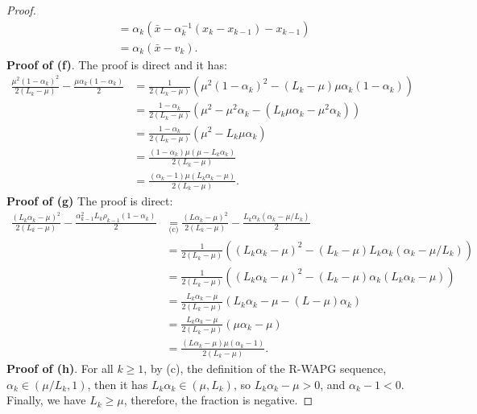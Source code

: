 \documentclass[12pt]{article}
\begin{document}
\begin{proof}
\begin{align*}
                &= \alpha_k(\bar x - \alpha_k^{-1}(x_k - x_{k - 1}) - x_{k - 1})
                \\
                &= \alpha_k (\bar x - v_k).
            \end{align*}
            \textbf{Proof of (f)}. 
            The proof is direct and it has: 
            \begin{align*}
                \frac{\mu^2(1 - \alpha_k)^2}{2(L_k - \mu)} - \frac{\mu\alpha_k(1 - \alpha_k)}{2}
                &= 
                \frac{1}{2(L_k - \mu)}\left(
                    \mu^2(1 - \alpha_k)^2 - (L_k - \mu)\mu \alpha_k(1 - \alpha_k)
                \right)
                \\
                &= \frac{1 - \alpha_k}{2(L_k - \mu)}\left(
                    \mu^2 - \mu^2\alpha_k - (L_k \mu \alpha_k - \mu^2 \alpha_k)
                \right)
                \\
                &= 
                \frac{1 - \alpha_k}{2(L_k - \mu)}\left(
                    \mu^2 - L_k\mu\alpha_k
                \right)
                \\
                &= \frac{(1 - \alpha_k)\mu(\mu - L_k\alpha_k)}{2(L_k - \mu)} 
                \\
                &= \frac{(\alpha_k - 1)\mu(L_k\alpha_k - \mu)}{2(L_k - \mu)}. 
            \end{align*}
            \textbf{Proof of (g)}
            The proof is direct: 
            \begin{align*}
                \frac{(L_k\alpha_k - \mu)^2}{2(L_k - \mu)} - \frac{\alpha_{k - 1}^2 L_k \rho_{k - 1}(1 - \alpha_k)}{2}
                &\underset{\text{(c)}}{=} \frac{(L\alpha_k - \mu)^2}{2(L_k - \mu)} - \frac{L_k\alpha_k(\alpha_k - \mu/L_k)}{2}
                \\
                &= \frac{1}{2(L_k - \mu)}\left(
                    (L_k\alpha_k - \mu)^2 - (L_k - \mu)L_k\alpha_k(\alpha_k - \mu/L_k)
                \right)
                \\
                &= 
                \frac{1}{2(L_k - \mu)}\left(
                    (L_k\alpha_k - \mu)^2 - (L_k - \mu)\alpha_k(L_k\alpha_k - \mu)
                \right)
                \\
                &= \frac{L_k\alpha_k - \mu}{2(L_k - \mu)}\left(
                    L_k\alpha_k - \mu - (L - \mu)\alpha_k
                \right)
                \\
                &= \frac{L_k\alpha_k - \mu}{2(L_k - \mu)}\left(
                    \mu\alpha_k - \mu
                \right)
                \\
                &= \frac{(L\alpha_k - \mu)\mu(\alpha_k - 1)}{2(L_k - \mu)}. 
            \end{align*}
            \textbf{Proof of (h)}. 
            For all $k \ge 1$, by (c), the definition of the R-WAPG sequence, $\alpha_k \in (\mu/L_k, 1)$, then it has $L_k\alpha_k \in (\mu, L_k)$, so $L_k\alpha_k - \mu > 0$, and $\alpha_k - 1 < 0$. 
            Finally, we have $L_k \ge \mu$, therefore, the fraction is negative. 
        \end{proof}
\end{document}
